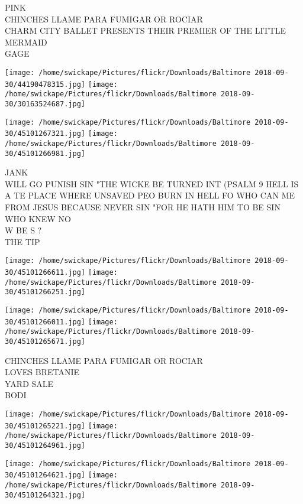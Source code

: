 \documentclass[10pt,letterpaper]{article}
\begin{document}
PINK\\
CHINCHES LLAME PARA FUMIGAR OR ROCIAR\\
CHARM CITY BALLET PRESENTS THEIR PREMIER OF THE LITTLE MERMAID\\
GAGE\\
\pagebreak

\texttt{[image: /home/swickape/Pictures/flickr/Downloads/Baltimore 2018-09-30/44190478315.jpg]}
\texttt{[image: /home/swickape/Pictures/flickr/Downloads/Baltimore 2018-09-30/30163524687.jpg]}

\texttt{[image: /home/swickape/Pictures/flickr/Downloads/Baltimore 2018-09-30/45101267321.jpg]}
\texttt{[image: /home/swickape/Pictures/flickr/Downloads/Baltimore 2018-09-30/45101266981.jpg]}

JANK\\
WILL GO PUNISH SIN "THE WICKE BE TURNED INT (PSALM 9 HELL IS A TE PLACE WHERE UNSAVED PEO BURN IN HELL FO WHO CAN ME FROM JESUS BECAUSE NEVER SIN "FOR HE HATH HIM TO BE SIN WHO KNEW NO\\
W BE S ?\\
THE TIP\\
\pagebreak

\texttt{[image: /home/swickape/Pictures/flickr/Downloads/Baltimore 2018-09-30/45101266611.jpg]}
\texttt{[image: /home/swickape/Pictures/flickr/Downloads/Baltimore 2018-09-30/45101266251.jpg]}

\texttt{[image: /home/swickape/Pictures/flickr/Downloads/Baltimore 2018-09-30/45101266011.jpg]}
\texttt{[image: /home/swickape/Pictures/flickr/Downloads/Baltimore 2018-09-30/45101265671.jpg]}

CHINCHES LLAME PARA FUMIGAR OR ROCIAR\\
LOVES BRETANIE\\
YARD SALE\\
BODI\\
\pagebreak

\texttt{[image: /home/swickape/Pictures/flickr/Downloads/Baltimore 2018-09-30/45101265221.jpg]}
\texttt{[image: /home/swickape/Pictures/flickr/Downloads/Baltimore 2018-09-30/45101264961.jpg]}

\texttt{[image: /home/swickape/Pictures/flickr/Downloads/Baltimore 2018-09-30/45101264621.jpg]}
\texttt{[image: /home/swickape/Pictures/flickr/Downloads/Baltimore 2018-09-30/45101264321.jpg]}
\end{document}
